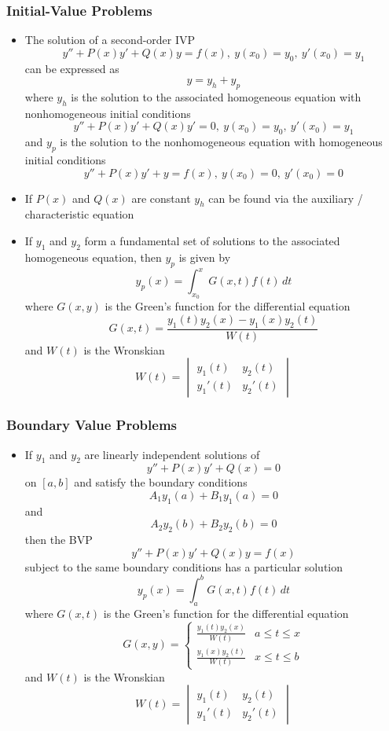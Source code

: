 \documentclass{article}
\begin{document}
\subsubsection{Initial-Value Problems}

\begin{itemize}
  \item The solution of a second-order IVP \[y'' + P(x) y' + Q(x) y = f(x), \: y(x_0) = y_0, \: y'(x_0) = y_1\] can be expressed as \[y = y_h + y_p\] where $y_h$ is the solution to the associated homogeneous equation with nonhomogeneous initial conditions \[y'' + P(x) y' + Q(x) y' = 0, \: y(x_0) = y_0, \: y'(x_0) = y_1\] and $y_p$ is the solution to the nonhomogeneous equation with homogeneous initial conditions \[y'' + P(x) y' + y = f(x), \: y(x_0) = 0, \: y'(x_0) = 0\]

  \item If $P(x)$ and $Q(x)$ are constant $y_h$ can be found via the auxiliary / characteristic equation

  \item If $y_1$ and $y_2$ form a fundamental set of solutions to the associated homogeneous equation, then $y_p$ is given by \[y_p(x) = \int_{x_0}^x G(x, t) f(t) \,dt\] where $G(x, y)$ is the Green's function for the differential equation \[G(x, t) = \frac{y_1(t) y_2(x) - y_1(x) y_2(t)}{W(t)}\] and $W(t)$ is the Wronskian \[W(t) = \begin{vmatrix}
            y_1(t)  & y_2(t)  \\
            y_1'(t) & y_2'(t)
          \end{vmatrix}\]
\end{itemize}

\subsubsection{Boundary Value Problems}

\begin{itemize}
  \item If $y_1$ and $y_2$ are linearly independent solutions of \[y'' + P(x) y' + Q(x) = 0\] on $[a, b]$ and satisfy the boundary conditions \[A_1 y_1(a) + B_1 y_1(a) = 0\] and \[A_2 y_2(b) + B_2 y_2(b) = 0\] then the BVP \[y'' + P(x) y' + Q(x) y = f(x)\] subject to the same boundary conditions has a particular solution \[y_p(x) = \int_a^b G(x, t) f(t) \,dt\] where $G(x, t)$ is the Green's function for the differential equation \[G(x, y) = \begin{cases}
            \frac{y_1(t) y_2(x)}{W(t)} & a \le t \le x \\
            \frac{y_1(x) y_2(t)}{W(t)} & x \le t \le b
          \end{cases}\] and $W(t)$ is the Wronskian \[W(t) = \begin{vmatrix}
            y_1(t)  & y_2(t)  \\
            y_1'(t) & y_2'(t)
          \end{vmatrix}\]
\end{itemize}
\end{document}

